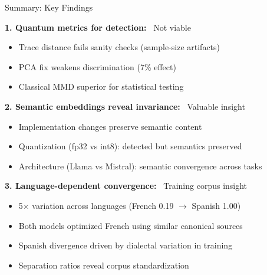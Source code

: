 \documentclass[aspectratio=169,11pt]{beamer}
\newcommand{\good}{\textcolor{darkgreen}{\ding{51}}}
\newcommand{\bad}{\textcolor{darkred}{\ding{55}}}
\begin{document}
\begin{frame}{Summary: Key Findings}

\textbf{1. Quantum metrics for detection:} \bad\ Not viable
\begin{itemize}
  \item Trace distance fails sanity checks (sample-size artifacts)
  \item PCA fix weakens discrimination (7\% effect)
  \item Classical MMD superior for statistical testing
\end{itemize}

\vspace{0.5em}

\textbf{2. Semantic embeddings reveal invariance:} \good\ Valuable insight
\begin{itemize}
  \item Implementation changes preserve semantic content
  \item Quantization (fp32 vs int8): detected but semantics preserved
  \item Architecture (Llama vs Mistral): semantic convergence across tasks
\end{itemize}

\vspace{0.5em}

\textbf{3. Language-dependent convergence:} \good\ Training corpus insight
\begin{itemize}
  \item 5$\times$ variation across languages (French 0.19 $\to$ Spanish 1.00)
  \item Both models optimized French using similar canonical sources
  \item Spanish divergence driven by dialectal variation in training
  \item Separation ratios reveal corpus standardization
\end{itemize}

\end{frame}
\end{document}
